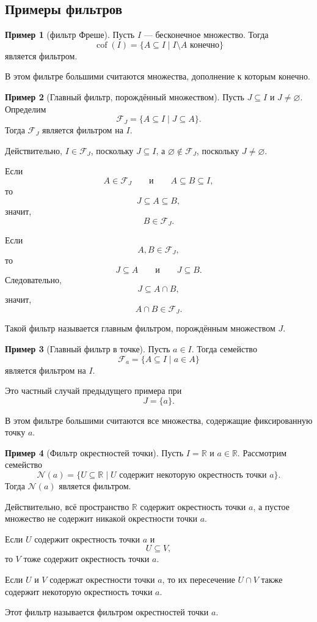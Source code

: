 \documentclass[12pt,a4paper,oneside,openany]{book}
\theoremstyle{definition}
\newtheorem{example}{Пример}[chapter]
\theoremstyle{plain}
\theoremstyle{remark}
\begin{document}
\subsection{Примеры фильтров}

\begin{example}[фильтр Фреше]
Пусть $I$ — бесконечное множество. Тогда
\[
\operatorname{cof}(I)
=
\{A\subseteq I\mid I\setminus A \text{ конечно}\}
\]
является фильтром.

В этом фильтре большими считаются множества, дополнение к которым конечно.
\end{example}

\begin{example}[Главный фильтр, порождённый множеством]
Пусть $J\subseteq I$ и $J\ne\varnothing$. Определим
\[
\mathcal F_J
=
\{A\subseteq I\mid J\subseteq A\}.
\]
Тогда $\mathcal F_J$ является фильтром на $I$.

Действительно, $I\in\mathcal F_J$, поскольку $J\subseteq I$, а $\varnothing\notin\mathcal F_J$, поскольку $J\ne\varnothing$.

Если
\[
A\in\mathcal F_J
\qquad
\text{и}
\qquad
A\subseteq B\subseteq I,
\]
то
\[
J\subseteq A\subseteq B,
\]
значит,
\[
B\in\mathcal F_J.
\]

Если
\[
A,B\in\mathcal F_J,
\]
то
\[
J\subseteq A
\qquad
\text{и}
\qquad
J\subseteq B.
\]
Следовательно,
\[
J\subseteq A\cap B,
\]
значит,
\[
A\cap B\in\mathcal F_J.
\]

Такой фильтр называется главным фильтром, порождённым множеством $J$.
\end{example}

\begin{example}[Главный фильтр в точке]
Пусть $a\in I$. Тогда семейство
\[
\mathcal F_a
=
\{A\subseteq I\mid a\in A\}
\]
является фильтром на $I$.

Это частный случай предыдущего примера при
\[
J=\{a\}.
\]

В этом фильтре большими считаются все множества, содержащие фиксированную точку $a$.
\end{example}

\begin{example}[Фильтр окрестностей точки]
Пусть $I=\mathbb R$ и $a\in\mathbb R$. Рассмотрим семейство
\[
\mathcal N(a)
=
\{U\subseteq\mathbb R\mid U\text{ содержит некоторую окрестность точки }a\}.
\]
Тогда $\mathcal N(a)$ является фильтром.

Действительно, всё пространство $\mathbb R$ содержит окрестность точки $a$, а пустое множество не содержит никакой окрестности точки $a$.

Если $U$ содержит окрестность точки $a$ и
\[
U\subseteq V,
\]
то $V$ тоже содержит окрестность точки $a$.

Если $U$ и $V$ содержат окрестности точки $a$, то их пересечение $U\cap V$ также содержит некоторую окрестность точки $a$.

Этот фильтр называется фильтром окрестностей точки $a$.
\end{example}
\end{document}
